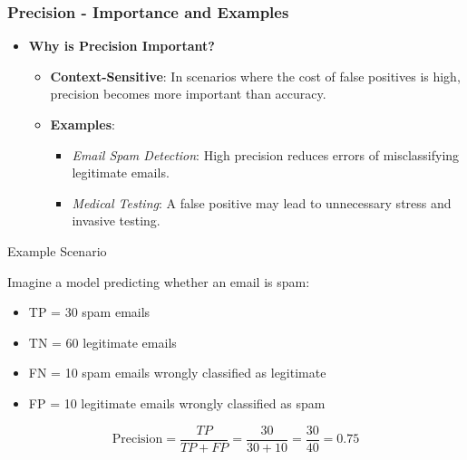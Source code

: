 \documentclass[aspectratio=169]{beamer}
\begin{document}
\begin{frame}[fragile]
    \frametitle{Precision - Importance and Examples}
    \begin{itemize}
        \item \textbf{Why is Precision Important?}
        \begin{itemize}
            \item \textbf{Context-Sensitive}: In scenarios where the cost of false positives is high, precision becomes more important than accuracy.
            \item \textbf{Examples}:
            \begin{itemize}
                \item \textit{Email Spam Detection}: High precision reduces errors of misclassifying legitimate emails.
                \item \textit{Medical Testing}: A false positive may lead to unnecessary stress and invasive testing.
            \end{itemize}
        \end{itemize}
    \end{itemize}
    
    \begin{block}{Example Scenario}
        \item Imagine a model predicting whether an email is spam:
        \begin{itemize}
            \item TP = 30 spam emails
            \item TN = 60 legitimate emails
            \item FN = 10 spam emails wrongly classified as legitimate
            \item FP = 10 legitimate emails wrongly classified as spam
        \end{itemize}
    \end{block}
    
    \begin{equation}
        \text{Precision} = \frac{TP}{TP + FP} = \frac{30}{30 + 10} = \frac{30}{40} = 0.75
    \end{equation}
\end{frame}
\end{document}
